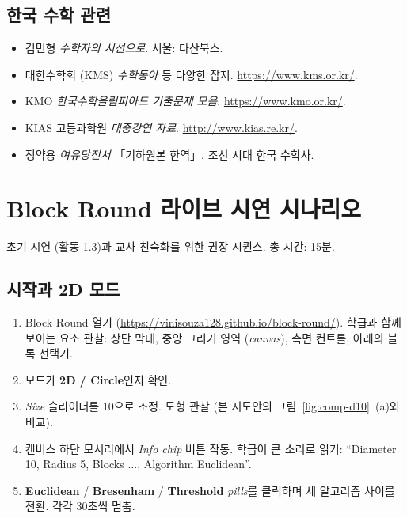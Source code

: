 \documentclass[12pt,a4paper]{scrartcl}
\newcommand{\acc}[1]{\textcolor{accent}{\textbf{#1}}}
\begin{document}
\subsection{한국 수학 관련}
\begin{itemize}[leftmargin=1.3em,itemsep=0.15em,topsep=0.3em]
  \item 김민형 \emph{수학자의 시선으로}. 서울: 다산북스.
  \item 대한수학회 (KMS) \emph{수학동아} 등 다양한 잡지. \url{https://www.kms.or.kr/}.
  \item KMO \emph{한국수학올림피아드 기출문제 모음}. \url{https://www.kmo.or.kr/}.
  \item KIAS 고등과학원 \emph{대중강연 자료}. \url{http://www.kias.re.kr/}.
  \item 정약용 \emph{여유당전서} 「기하원본 한역」. 조선 시대 한국 수학사.
\end{itemize}

\newpage
\appendix
\renewcommand{\thesection}{\Alph{section}}
\setcounter{section}{0}

\section{Block Round 라이브 시연 시나리오}\label{ap:roteiro}

초기 시연 (활동 1.3)과 교사 친숙화를 위한 권장 시퀀스. 총 시간: 15분.

\subsection{시작과 2D 모드}
\begin{enumerate}[leftmargin=1.5em,itemsep=0.15em,topsep=0.3em]
  \item Block Round 열기 (\url{https://vinisouza128.github.io/block-round/}). 학급과 함께 보이는 요소 관찰: 상단 막대, 중앙 그리기 영역 (\emph{canvas}), 측면 컨트롤, 아래의 블록 선택기.
  \item 모드가 \acc{2D / Circle}인지 확인.
  \item \emph{Size} 슬라이더를 10으로 조정. 도형 관찰 (본 지도안의 그림~\ref{fig:comp-d10}~(a)와 비교).
  \item 캔버스 하단 모서리에서 \emph{Info chip} 버튼 작동. 학급이 큰 소리로 읽기: \enquote{Diameter 10, Radius 5, Blocks $\dots$, Algorithm Euclidean}.
  \item \acc{Euclidean} / \acc{Bresenham} / \acc{Threshold} \emph{pills}를 클릭하며 세 알고리즘 사이를 전환. 각각 30초씩 멈춤.
\end{enumerate}
\end{document}
